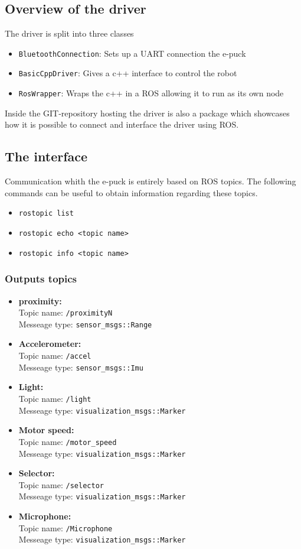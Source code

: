 \documentclass{article}
\newcommand{\stt}[1]{{\small\tt #1}}
\begin{document}
\subsection{Overview of the driver}
The driver is split into three classes
\begin{itemize}
\item \stt{BluetoothConnection}: Sets up a UART connection the e-puck
\item \stt{BasicCppDriver}: Gives a c++ interface to control the robot
\item \stt{RosWrapper}: Wraps the c++ in a ROS allowing it to run as its own node
\end{itemize}

Inside the GIT-repository hosting the driver is also a package which showcases how it is possible to connect and interface the driver using ROS.

\subsection{The interface}
Communication whith the e-puck is entirely based on ROS topics. The following commands can be useful to obtain information regarding these topics.
\begin{itemize}
\item \stt{rostopic list}
\item \stt{rostopic echo \textless topic name\textgreater}
\item \stt{rostopic info \textless topic name\textgreater}
\end{itemize}

\subsubsection*{Outputs topics}
\begin{itemize}
\item \textbf{proximity: } 
\\Topic name: \stt{/proximityN} 
\\Messeage type: \stt{sensor\_msgs::Range} 
%
\item \textbf{Accelerometer: } 
\\Topic name: \stt{/accel} 
\\Messeage type: \stt{sensor\_msgs::Imu} 
%
\item \textbf{Light: } 
\\Topic name: \stt{/light} 
\\Messeage type: \stt{visualization\_msgs::Marker} 
%
\item \textbf{Motor speed: } 
\\Topic name: \stt{/motor\_speed} 
\\Messeage type: \stt{visualization\_msgs::Marker} 
%
\item \textbf{Selector: } 
\\Topic name: \stt{/selector} 
\\Messeage type: \stt{visualization\_msgs::Marker} 
%
\item \textbf{Microphone: } 
\\Topic name: \stt{/Microphone} 
\\Messeage type: \stt{visualization\_msgs::Marker} 
%
\end{itemize}
\end{document}
